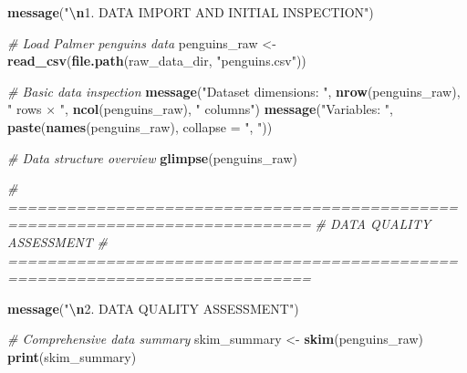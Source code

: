 \documentclass[
]{article}
\newenvironment{Shaded}{\begin{snugshade}}{\end{snugshade}}
\newcommand{\AttributeTok}[1]{\textcolor[rgb]{0.13,0.29,0.53}{#1}}
\newcommand{\CommentTok}[1]{\textcolor[rgb]{0.56,0.35,0.01}{\textit{#1}}}
\newcommand{\FunctionTok}[1]{\textcolor[rgb]{0.13,0.29,0.53}{\textbf{#1}}}
\newcommand{\NormalTok}[1]{#1}
\newcommand{\OtherTok}[1]{\textcolor[rgb]{0.56,0.35,0.01}{#1}}
\newcommand{\SpecialCharTok}[1]{\textcolor[rgb]{0.81,0.36,0.00}{\textbf{#1}}}
\newcommand{\StringTok}[1]{\textcolor[rgb]{0.31,0.60,0.02}{#1}}
\begin{document}
\begin{Shaded}
\begin{Highlighting}[]
\FunctionTok{message}\NormalTok{(}\StringTok{"}\SpecialCharTok{\textbackslash{}n}\StringTok{1. DATA IMPORT AND INITIAL INSPECTION"}\NormalTok{)}

\CommentTok{\# Load Palmer penguins data}
\NormalTok{penguins\_raw }\OtherTok{\textless{}{-}} \FunctionTok{read\_csv}\NormalTok{(}\FunctionTok{file.path}\NormalTok{(raw\_data\_dir, }\StringTok{"penguins.csv"}\NormalTok{))}

\CommentTok{\# Basic data inspection}
\FunctionTok{message}\NormalTok{(}\StringTok{"Dataset dimensions: "}\NormalTok{, }\FunctionTok{nrow}\NormalTok{(penguins\_raw), }\StringTok{" rows × "}\NormalTok{, }\FunctionTok{ncol}\NormalTok{(penguins\_raw), }\StringTok{" columns"}\NormalTok{)}
\FunctionTok{message}\NormalTok{(}\StringTok{"Variables: "}\NormalTok{, }\FunctionTok{paste}\NormalTok{(}\FunctionTok{names}\NormalTok{(penguins\_raw), }\AttributeTok{collapse =} \StringTok{", "}\NormalTok{))}

\CommentTok{\# Data structure overview}
\FunctionTok{glimpse}\NormalTok{(penguins\_raw)}

\CommentTok{\# =============================================================================}
\CommentTok{\# DATA QUALITY ASSESSMENT}
\CommentTok{\# =============================================================================}

\FunctionTok{message}\NormalTok{(}\StringTok{"}\SpecialCharTok{\textbackslash{}n}\StringTok{2. DATA QUALITY ASSESSMENT"}\NormalTok{)}

\CommentTok{\# Comprehensive data summary}
\NormalTok{skim\_summary }\OtherTok{\textless{}{-}} \FunctionTok{skim}\NormalTok{(penguins\_raw)}
\FunctionTok{print}\NormalTok{(skim\_summary)}


\end{Highlighting}
\end{Shaded}
\end{document}
